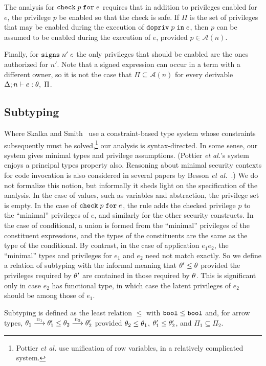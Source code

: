 \documentclass[submission,copyright,creativecommons]{eptcs}
\newcommand{\enable}[2]{\ENABLE\;#1\;\IN\;#2}
\newcommand{\chk}[2]{\CHK\;#1\;\FOR\;#2}
\newcommand{\signs}[2]{\SIGNS\;#1\;#2}
\newcommand{\BOOL}{\mbox{\texttt{bool}}}
\newcommand{\FOR}{\mbox{\texttt{for}}}
\newcommand{\IN}{\mbox{\texttt{in}}}
\newcommand{\A}{\mathcal{A}}
\newcommand{\proves}{\vdash}
\def\lpields#1{\stackrel{#1}{\longrightarrow}}
\newcommand{\annoto}[1]{\lpields {\scriptscriptstyle #1}}
\newcommand{\ENABLE}{\mbox{\texttt{dopriv}}}
\newcommand{\CHK}{\mbox{\texttt{check}}}
\newcommand{\SIGNS}{\mbox{\texttt{signs}}}
\newcommand{\n}{n} \newcommand{\p}{p} \newcommand{\Ps}{\Pi} \newcommand{\h}{h}
\begin{document}
The analysis for $\chk{\p}{e}$ requires that in
addition to privileges enabled for $e$, the privilege $\p$ be enabled
so that the check is safe. If $\Ps$ is the set of privileges that may
be enabled during the execution of $\enable{\p}{e}$, then $\p$ can be assumed 
to be enabled during the execution of $e$, provided $\p\in\A(\n)$.

Finally, for $\signs{\n'}{e}$ the only privileges that should be enabled are the ones
authorized for $\n'$.  Note that a signed expression can occur in a term with a different
owner, so it is not the case that $\Ps\subseteq\A(\n)$ for every derivable 
$\Delta;\n\proves e:\th,\; \Ps$.  

\subsection{Subtyping}

Where Skalka and Smith~\cite{SkalkaS:ICFP00} use a constraint-based type system whose constraints subsequently must be solved,\footnote{Pottier \emph{et al.} \cite{PottierSS05} use unification of row variables,
  in a relatively complicated system.}
our analysis is syntax-directed. In some sense,
our system gives minimal types and privilege assumptions. (Pottier \emph{et al.}'s system \cite{PottierSS05} enjoys a principal types property also. Reasoning about minimal security contexts for code invocation is also considered in several papers by Besson \emph{et al.}~\cite{BessonJM01,BessonBFG04,BessonLJ05}.) We do not
formalize this notion, but informally it sheds light on the
specification of the analysis.  In the case of values, such as
variables and abstraction, the privilege set is empty.  In the case of
$\chk{\p}{e}$, the rule adds the checked privilege $\p$ to the
``minimal'' privileges of $e$, and similarly for the other security
constructs.  In the case of conditional, a union is formed from the
``minimal'' privileges of the constituent expressions, and the types
of the constituents are the same as the type of the conditional.  By
contrast, in the case of application $e_1 e_2$, the ``minimal'' types
and privileges for $e_1$ and $e_2$ need not match exactly.  So we
define a relation of subtyping with the informal meaning that
$\theta'\leq \theta$ provided the privileges required by $\theta'$ are
contained in those required by $\theta$.  This is significant only in
case $e_2$ has functional type, in which case the latent privileges of
$e_2$ should be among those of $e_1$.

Subtyping is defined as the least relation $\leq$ with
$\BOOL \leq \BOOL$ and, for arrow types, $\th_1\annoto{\Ps_1}\th'_1\leq\th_2\annoto{\Ps_2}\th'_2$
provided $\theta_2\leq\theta_1$, $\theta'_1\leq\theta'_2$, and $\Ps_1\subseteq\Ps_2$.
\end{document}
